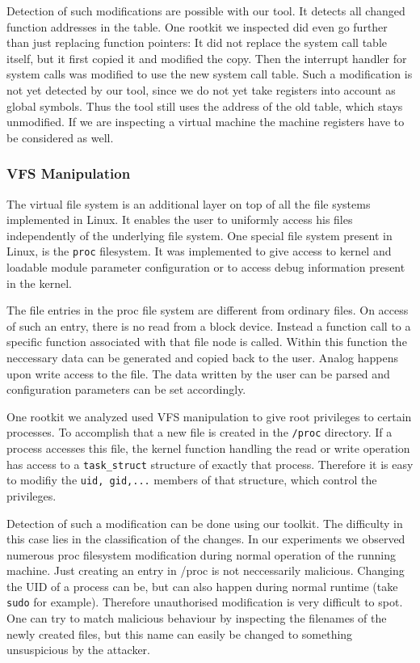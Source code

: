Detection of such modifications are possible with our tool. It detects all changed function addresses in the table. 
One rootkit we inspected did even go further than just replacing function pointers: It did not replace the system call 
table itself, but it first copied it and modified the copy. Then the interrupt handler for system calls was modified 
to use the new system call table. Such a modification is not yet detected by our tool, since we do not yet take
registers into account as global symbols. Thus the tool still uses the address 
of the old table, which stays unmodified. If we are inspecting a virtual machine the machine registers have to be
considered as well.

\subsubsection{VFS Manipulation}
The virtual file system is an additional layer on top of all the file systems implemented in Linux. 
It enables the user to uniformly access his files independently of the underlying file system. One special 
file system present in Linux, is the \texttt{proc} filesystem. It was implemented to give access to 
kernel and loadable module parameter configuration or to access debug information present in the kernel. 

The file entries in the proc file system are different from ordinary files. On access of such an entry, 
there is no read from a block device. Instead a function call to a specific function associated with that 
file node is called. Within this function the neccessary data can be generated and copied back to the user. 
Analog happens upon write access to the file. The data written by the user can be parsed and configuration 
parameters can be set accordingly.

One rootkit we analyzed used VFS manipulation to give root privileges to certain processes. To accomplish 
that a new file is created in the \texttt{/proc} directory. If a process accesses this file, the kernel function 
handling the read or write operation has access to a \texttt{task\_struct} structure of exactly that process. 
Therefore it is easy to modifiy the \texttt{uid, gid,...} members of that structure, which control the privileges.

Detection of such a modification can be done using our toolkit. The difficulty in this case lies in the 
classification of the changes. In our experiments we observed numerous proc filesystem modification during normal 
operation of the running machine. Just creating an entry in /proc is not neccessarily malicious. Changing the 
UID of a process can be, but can also happen during normal runtime (take \texttt{sudo} for example). 
Therefore unauthorised modification is very difficult to spot. One can try 
to match malicious behaviour by inspecting the filenames of the newly created files, but this name can easily 
be changed to something unsuspicious by the attacker.

